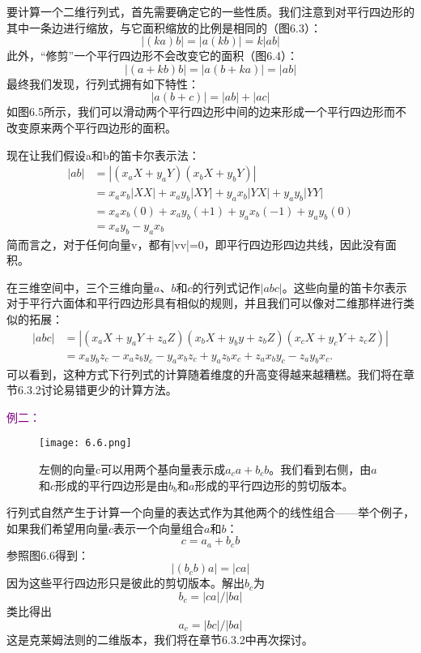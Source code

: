 要计算一个二维行列式，首先需要确定它的一些性质。我们注意到对平行四边形的其中一条边进行缩放，与它面积缩放的比例是相同的（图6.3）：
\[
  |(ka)b| =  |a(kb)| = k|ab|
\]
此外，“修剪”一个平行四边形不会改变它的面积（图6.4）：
\[
  |(a+kb)b| =  |a(b+ka)| = |ab|
\]
最终我们发现，行列式拥有如下特性：
\begin{equation}
  |a(b+c)| =  |ab| + |ac|
\end{equation}
如图6.5所示，我们可以滑动两个平行四边形中间的边来形成一个平行四边形而不改变原来两个平行四边形的面积。

现在让我们假设a和b的笛卡尔表示法：
\[
  \begin{aligned}
    |ab| & = |(x_aX + y_aY)(x_bX + y_bY)| \nonumber               \\
         & =x_ax_b|XX|+x_ay_b|XY|+y_ax_b|YX|+y_ay_b|YY| \nonumber \\
         & =x_ax_b(0)+x_ay_b(+1)+y_ax_b(-1)+y_ay_b(0) \nonumber   \\
         & = x_a y_b - y_a x_b \nonumber
  \end{aligned}
\]
简而言之，对于任何向量v，都有|vv|=0，即平行四边形四边共线，因此没有面积。

在三维空间中，三个三维向量$a$、$b$和$c$的行列式记作$|abc|$。这些向量的笛卡尔表示对于平行六面体和平行四边形具有相似的规则，并且我们可以像对二维那样进行类似的拓展：
\begin{equation}
  \begin{aligned}
    |abc| & = |(x_aX+y_aY+z_aZ)(x_bX+y_by+z_bZ)(x_cX+y_cY+z_cZ)| \nonumber          \\
          & =x_ay_bz_c-x_az_by_c-y_ax_bz_c+y_az_bx_c+z_ax_by_c-z_ay_bx_c \nonumber.
  \end{aligned}
\end{equation}
可以看到，这种方式下行列式的计算随着维度的升高变得越来越糟糕。我们将在章节6.3.2讨论易错更少的计算方法。

\textcolor{purple}{例二：}

\begin{figure}[htbp]
  \centering
  \texttt{[image: 6.6.png]}
  \caption{左侧的向量c可以用两个基向量表示成$a_ca+b_cb$。我们看到右侧，由$a$和$c$形成的平行四边形是由$b_b$和$a$形成的平行四边形的剪切版本。}
\end{figure}

行列式自然产生于计算一个向量的表达式作为其他两个的线性组合——举个例子，如果我们希望用向量$c$表示一个向量组合$a$和$b$：
\[
  c = a_a + b_cb
\]
参照图6.6得到：
\[
  |(b_cb)a| = |ca|
\]
因为这些平行四边形只是彼此的剪切版本。解出$b_c$为
\[
  b_c = |ca|/|ba|
\]
类比得出
\[
  a_c = |bc|/|ba|
\]
这是克莱姆法则的二维版本，我们将在章节6.3.2中再次探讨。


